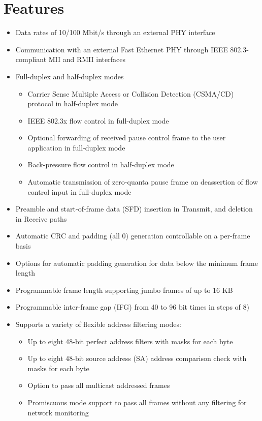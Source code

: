 \documentclass[main\_\_EN.tex]{subfiles}
\begin{document}
\section{Features}

\begin{itemize}
	\item Data rates of 10/100 Mbit/s through an external PHY interface
	\item Communication with an external Fast Ethernet PHY through IEEE 802.3-compliant MII and RMII interfaces
	\item Full-duplex and half-duplex modes
	\begin{itemize}
    	\item Carrier Sense Multiple Access or Collision Detection (CSMA/CD) protocol in half-duplex mode
    	\item IEEE 802.3x flow control in full-duplex mode
    	\item Optional forwarding of received pause control frame to the user application in full-duplex mode
    	\item Back-pressure flow control in half-duplex mode
    	\item Automatic transmission of zero-quanta pause frame on deassertion of flow control input in full-duplex mode
	\end{itemize}
	\item Preamble and start-of-frame data (SFD) insertion in Transmit, and deletion in Receive paths
	\item Automatic CRC and padding (all 0) generation controllable on a per-frame basis
	\item Options for automatic padding generation for data below the minimum frame length
	\item Programmable frame length supporting jumbo frames of up to 16 KB
	\item Programmable inter-frame gap (IFG) from 40 to 96 bit times in steps of 8)
	\item Supports a variety of flexible address filtering modes:
    \begin{itemize}
    	\item Up to eight 48-bit perfect address filters with masks for each byte
    	\item Up to eight 48-bit source address (SA) address comparison check with masks for each byte
        \item Option to pass all multicast addressed frames
        \item Promiscuous mode support to pass all frames without any filtering for network monitoring

\end{itemize}
\end{itemize}
\end{document}
